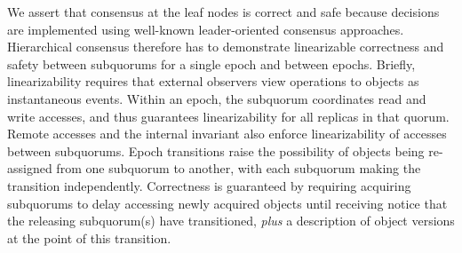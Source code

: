 \documentclass[11pt,letterpaper]{article}
\begin{document}
We assert that consensus at the leaf nodes is correct and safe because decisions are
implemented using well-known leader-oriented consensus approaches.
Hierarchical consensus therefore has to demonstrate linearizable correctness and safety
between subquorums for a single epoch and between epochs.
Briefly, linearizability requires that external observers view operations to objects as
instantaneous events.
Within an epoch, the subquorum coordinates read and write accesses, and thus guarantees
linearizability for all replicas in that quorum.
Remote accesses and the internal invariant also enforce linearizability of accesses
between subquorums.
Epoch transitions raise the possibility of objects being re-assigned from one subquorum to
another, with each subquorum making the transition independently. Correctness is
guaranteed by requiring acquiring subquorums to delay accessing newly acquired objects
until receiving notice that the releasing subquorum(s) have transitioned, \emph{plus} a
description of object versions at the point of this transition.
\end{document}

